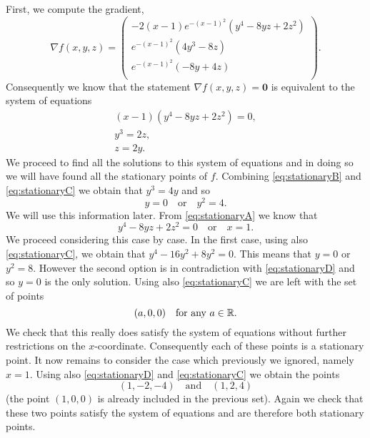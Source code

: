 \begin{solution}
    First, we compute the gradient,
    \[
        \nabla f(x,y,z) =  \left(
        \begin{array}{c}
                -2(x-1)e^{-(x-1)^2}(y^4 - 8yz + 2z^2) \\
                e^{-(x-1)^2}(4y^{3} - 8 z)            \\
                e^{-(x-1)^2}(-8 y + 4 z)              \\
            \end{array}
        \right).
    \]
    Consequently we know that the statement \(\nabla f(x,y,z) = \mathbf{0}\) is equivalent to the system of equations
    \begin{gather}
        (x-1)(y^4 - 8yz + 2z^2) = 0, \label{eq:stationaryA}\\
        y^3 = 2z,  \label{eq:stationaryB}\\
        z = 2y.    \label{eq:stationaryC}
    \end{gather}
    We proceed to find all the solutions to this system of equations and in doing so we will have found all the stationary points of \(f\).
    Combining \eqref{eq:stationaryB} and \eqref{eq:stationaryC} we obtain that \(y^3 = 4y\) and so
    \begin{equation}
        \label{eq:stationaryD}
        y = 0 \quad \text{or} \quad y^2 = 4.
    \end{equation}
    We will use this information later.
    From \eqref{eq:stationaryA} we know that
    \[
        y^4 - 8yz + 2z^2 = 0
        \quad \text{or} \quad
        x = 1.
    \]
    We proceed considering this case by case.
    In the first case, using also \eqref{eq:stationaryC}, we obtain that \(y^4 - 16 y^2 + 8y^2 = 0\).
    This means that \(y=0\) or \(y^2 = 8\).
    However the second option is in contradiction with \eqref{eq:stationaryD} and so \(y=0\) is the only solution.
    Using also \eqref{eq:stationaryC} we are left with the set of points
    \[
        (a,0,0) \quad \text{for any \(a\in\mathbb{R}\)}.
    \]
    We check that this really does satisfy the system of equations without further restrictions on the \(x\)-coordinate.
    Consequently each of these points is a stationary point.
    It now remains to consider the case which previously we ignored, namely \(x=1\).
    Using also \eqref{eq:stationaryD} and \eqref{eq:stationaryC} we obtain the points
    \[
        (1,-2,-4)
        \quad \text{and} \quad
        (1,2,4)
    \]
    (the point \((1,0,0)\) is already included in the previous set).
    Again we check that these two points satisfy the system of equations and are therefore both stationary points.


\end{solution}
